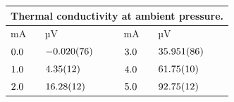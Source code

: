 \begin{tabular}{|p{}|p{}||p{}|p{}|}
\hline
\multicolumn{4}{|c|}{Thermal conductivity at ambient pressure.}\\
\hline
mA&µV&mA&µV\\
\hline
$\num{0.0\pm 0.0}$&$\num{-0.02\pm 0.076}$&$\num{3.0\pm 0.0}$&$\num{35.951\pm 0.086}$\\
$\num{1.0\pm 0.0}$&$\num{4.35\pm 0.12}$&$\num{4.0\pm 0.0}$&$\num{61.75\pm 0.1}$\\
$\num{2.0\pm 0.0}$&$\num{16.28\pm 0.12}$&$\num{5.0\pm 0.0}$&$\num{92.75\pm 0.12}$\\
\hline
\end{tabular}
